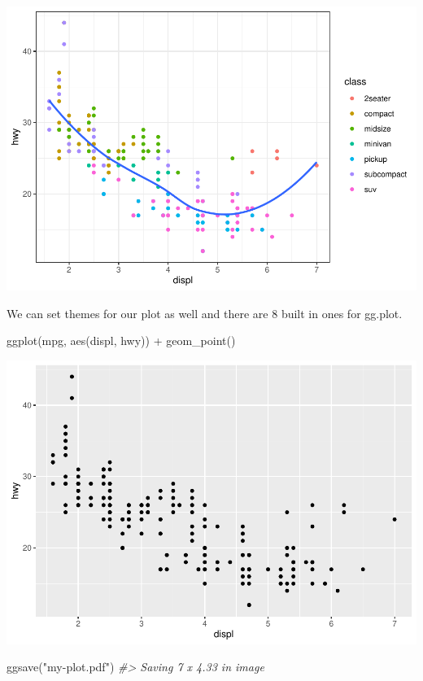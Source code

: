 \documentclass[
]{article}
\newenvironment{Shaded}{\begin{snugshade}}{\end{snugshade}}
\newcommand{\CommentTok}[1]{\textcolor[rgb]{0.56,0.35,0.01}{\textit{#1}}}
\newcommand{\FunctionTok}[1]{\textcolor[rgb]{0.00,0.00,0.00}{#1}}
\newcommand{\NormalTok}[1]{#1}
\newcommand{\SpecialCharTok}[1]{\textcolor[rgb]{0.00,0.00,0.00}{#1}}
\newcommand{\StringTok}[1]{\textcolor[rgb]{0.31,0.60,0.02}{#1}}
\begin{document}
\includegraphics{Journal_files/figure-latex/unnamed-chunk-62-1.pdf}

We can set themes for our plot as well and there are 8 built in ones for
gg.plot.

\begin{Shaded}
\begin{Highlighting}[]
\FunctionTok{ggplot}\NormalTok{(mpg, }\FunctionTok{aes}\NormalTok{(displ, hwy)) }\SpecialCharTok{+} \FunctionTok{geom\_point}\NormalTok{()}
\end{Highlighting}
\end{Shaded}

\includegraphics{Journal_files/figure-latex/unnamed-chunk-63-1.pdf}

\begin{Shaded}
\begin{Highlighting}[]
\FunctionTok{ggsave}\NormalTok{(}\StringTok{"my{-}plot.pdf"}\NormalTok{)}
\CommentTok{\#\textgreater{} Saving 7 x 4.33 in image}
\end{Highlighting}
\end{Shaded}
\end{document}
